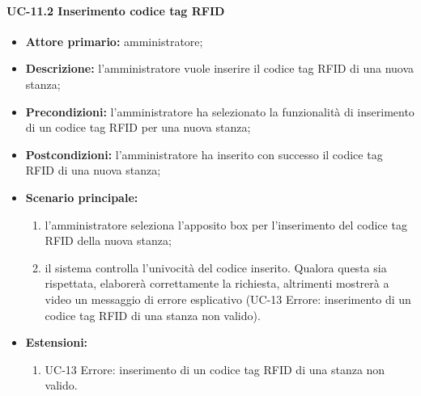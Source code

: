 \paragraph{UC-11.2 Inserimento codice tag RFID}
   \begin{itemize}
	\item \textbf{Attore primario:} amministratore;
	\item \textbf{Descrizione:} l'amministratore vuole inserire il codice tag RFID di una nuova stanza;
	\item \textbf{Precondizioni:} l'amministratore ha selezionato la funzionalità di inserimento di un codice tag RFID per una nuova stanza;
	\item \textbf{Postcondizioni:} l'amministratore ha inserito con successo il codice tag RFID di una nuova stanza;
	\item \textbf{Scenario principale:}
	      \begin{enumerate}
		      \item l'amministratore seleziona l'apposito box per l'inserimento del codice tag RFID della nuova stanza;
		      \item il sistema controlla l'univocità del codice inserito. Qualora questa sia rispettata, elaborerà correttamente la richiesta, altrimenti mostrerà a video un messaggio di errore esplicativo (UC-13 Errore: inserimento di un codice tag RFID di una stanza non valido).
	      \end{enumerate}
	\item \textbf{Estensioni:}
		\begin{enumerate}
		      \item UC-13 Errore: inserimento di un codice tag RFID di una stanza non valido.
	      \end{enumerate}
\end{itemize}


